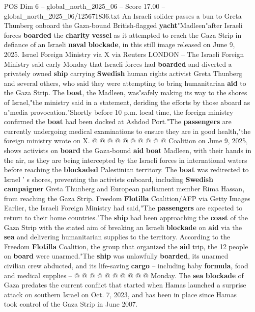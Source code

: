 \begin{textsample}{POS Dim 6 – global\_north\_2025\_06 – Score 17.00 – global\_north\_2025\_06/125671836.txt}  \label{ex:f6_pos_030}
An Israeli solider passes a bun to Greta Thunberg onboard the Gaza-bound British-flagged \textbf{yacht}"Madleen"after Israeli forces \textbf{boarded} the \textbf{charity} \textbf{vessel} as it attempted to reach the Gaza Strip in defiance of an Israeli \textbf{naval} \textbf{blockade}, in this still image released on June 9, 2025.
Israel Foreign Ministry via X via Reuters LONDON -- The Israeli Foreign Ministry said early Monday that Israeli forces had \textbf{boarded} and diverted a privately owned \textbf{ship} carrying \textbf{Swedish} human rights activist Greta Thunberg and several others, who said they were attempting to bring humanitarian \textbf{aid} to the Gaza Strip.
The \textbf{boat}, the Madleen, was"safely making its way to the shores of Israel,"the ministry said in a statement, deriding the efforts by those aboard as a"media provocation."Shortly before 10 p.m. local time, the foreign ministry confirmed the \textbf{boat} had been docked at Ashdod Port."The \textbf{passengers} are currently undergoing medical examinations to ensure they are in good health,"the foreign ministry wrote on X. @ @ @ @ @ @ @ @ @ @ Coalition on June 9, 2025, shows activists on \textbf{board} the Gaza-bound \textbf{aid} \textbf{boat} Madleen, with their hands in the air, as they are being intercepted by the Israeli forces in international waters before reaching the \textbf{blockaded} Palestinian territory.
The \textbf{boat} was redirected to Israel ' s shores, preventing the activists onboard, including \textbf{Swedish} \textbf{campaigner} Greta Thunberg and European parliament member Rima Hassan, from reaching the Gaza Strip.
Freedom \textbf{Flotilla} Coalition/AFP via Getty Images Earlier, the Israeli Foreign Ministry had said,"The \textbf{passengers} are expected to return to their home countries."The \textbf{ship} had been approaching the \textbf{coast} of the Gaza Strip with the stated aim of breaking an Israeli \textbf{blockade} on \textbf{aid} via the \textbf{sea} and delivering humanitarian supplies to the territory.
According to the Freedom \textbf{Flotilla} Coalition, the group that organized the \textbf{aid} trip, the 12 people on \textbf{board} were unarmed."The \textbf{ship} was unlawfully \textbf{boarded}, its unarmed civilian crew abducted, and its life-saving \textbf{cargo} -- including baby \textbf{formula}, food and medical supplies -- @ @ @ @ @ @ @ @ @ @ Monday.
The \textbf{sea} \textbf{blockade} of Gaza predates the current conflict that started when Hamas launched a surprise attack on southern Israel on Oct. 7, 2023, and has been in place since Hamas took control of the Gaza Strip in June 2007.

\end{textsample}
